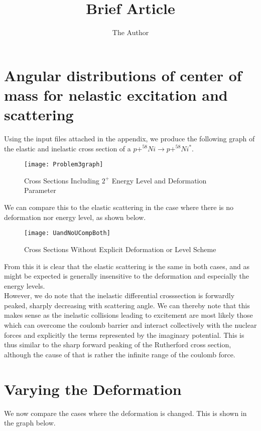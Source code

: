 \documentclass[11pt]{article} %
\title{Brief Article}
\author{The Author}
\begin{document}
\maketitle

\section{Angular distributions of center of mass for nelastic excitation and scattering}

Using the input files attached in the appendix, we produce the following graph of the elastic and inelastic cross section of a $p+ ^{58}Ni \rightarrow p+ ^{58}Ni^*$. 
\begin{figure}[hbt!]
\centering
\texttt{[image: Problem3graph]} 
\caption{Cross Sections Including $2^+$ Energy Level and Deformation Parameter}
\end{figure}
\FloatBarrier
We can compare this to the elastic scattering in the case where there is no deformation nor energy level, as shown below.\\

\begin{figure}[hbt!]
\centering
\texttt{[image: UandNoUCompBoth]}
\caption{Cross Sections Without Explicit Deformation or Level Scheme}
\end{figure}
\FloatBarrier
From this it is clear that the elastic scattering is the same in both cases, and as might be expected is generally insensitive to the deformation and especially the energy levels.\\

However, we do note that the inelastic differential crosssection is forwardly peaked, sharply decreasing with scattering angle. We can thereby note that this makes sense as the inelastic collisions leading to excitement are most likely those which can overcome the coulomb barrier and interact collectively with the nuclear forces and explicitly the terms represented by the imaginary potential. This is thus similar to the sharp forward peaking of the Rutherford cross section, although the cause of that is rather the infinite range of the coulomb force. 

\section{Varying the Deformation}

We now compare the cases where the deformation is changed. This is shown in the graph below.\\
\end{document}
